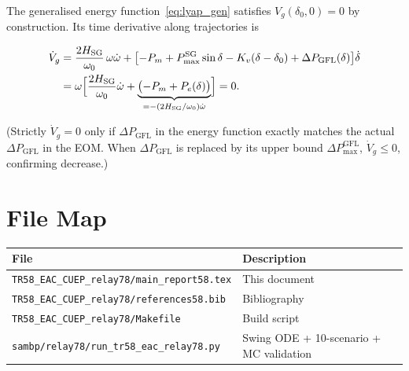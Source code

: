 \documentclass[11pt,a4paper]{article}
\newcommand{\dz}{\delta_0}         %
\newcommand{\Pm}{P_m}
\newcommand{\PmaxSG}{P_{\max}^{\mathrm{SG}}}
\newcommand{\Kv}{K_v}
\newcommand{\Hsg}{H_{\mathrm{SG}}}
\newcommand{\omegaz}{\omega_0}
\begin{document}
The generalised energy function~\eqref{eq:lyap_gen} satisfies
$V_g(\dz, 0) = 0$ by construction.
Its time derivative along trajectories is

\begin{align*}
  \dot{V}_g &= \frac{2\Hsg}{\omegaz}\,\omega\dot\omega
    + \bigl[-\Pm + \PmaxSG\sin\delta - \Kv(\delta-\dz)
      + \Delta P_{\mathrm{GFL}}(\delta)\bigr]\dot\delta \\
  &= \omega\Bigl[\frac{2\Hsg}{\omegaz}\dot\omega
    + \underbrace{\bigl(-\Pm + P_e(\delta)\bigr)}_{= -(2\Hsg/\omegaz)\dot\omega}\Bigr]
  = 0.
\end{align*}

(Strictly $\dot V_g = 0$ only if $\Delta P_\mathrm{GFL}$ in the energy
function exactly matches the actual $\Delta P_\mathrm{GFL}$ in the EOM.
When $\Delta P_\mathrm{GFL}$ is replaced by its upper bound
$\Delta P_{\max}^\mathrm{GFL}$, $\dot V_g \leq 0$, confirming decrease.)

\appendix
\section{File Map}
\label{app:files}

\begin{tabular}{ll}
  \toprule
  File & Description \\
  \midrule
  \texttt{TR58\_EAC\_CUEP\_relay78/main\_report58.tex} & This document \\
  \texttt{TR58\_EAC\_CUEP\_relay78/references58.bib}   & Bibliography \\
  \texttt{TR58\_EAC\_CUEP\_relay78/Makefile}           & Build script \\
  \texttt{sambp/relay78/run\_tr58\_eac\_relay78.py}    & Swing ODE + 10-scenario + MC validation \\
  \bottomrule
\end{tabular}



\end{document}
